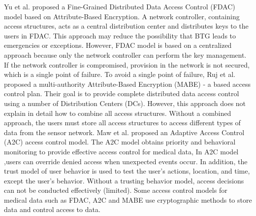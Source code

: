Yu et al. \cite{yu2011fdac} proposed a Fine-Grained Distributed Data Access Control (FDAC) model based on Attribute-Based Encryption. 
A network controller, containing access structures, acts as a central distribution center and distributes keys to the users in FDAC. 
This approach may reduce the possibility that BTG leads to emergencies or exceptions.
However, FDAC model is based on a centralized approach because only the network controller can perform the key management. 
If the network controller is compromised, provision in the network is not secured, which is a single point of failure.
To avoid a single point of failure, Ruj et al. \cite{ruj2011distributed} proposed a multi-authority Attribute-Based Encryption (MABE) - a based access control plan. 
Their goal is to provide complete distributed data access control using a number of Distribution Centers (DCs). 
However, this approach does not explain in detail how to combine all access structures. 
Without a combined approach, the users must store all access structures to access different types of data from the sensor network. 
Maw et al. \cite{maw2013adaptive} proposed an Adaptive Access Control (A2C) access control model. 
The A2C  model obtains priority and behavioral monitoring to provide effective access control for medical data,
In A2C model ,users can override denied access when unexpected events occur.
In addition, the trust model of user behavior is used to test the user's actions, location, and time, except the user's behavior. 
Without a trusting behavior model, access decisions can not be conducted effectively (limited). 
Some access control models for medical data such as FDAC, A2C and MABE use cryptographic methods to store data and control access to data. 
